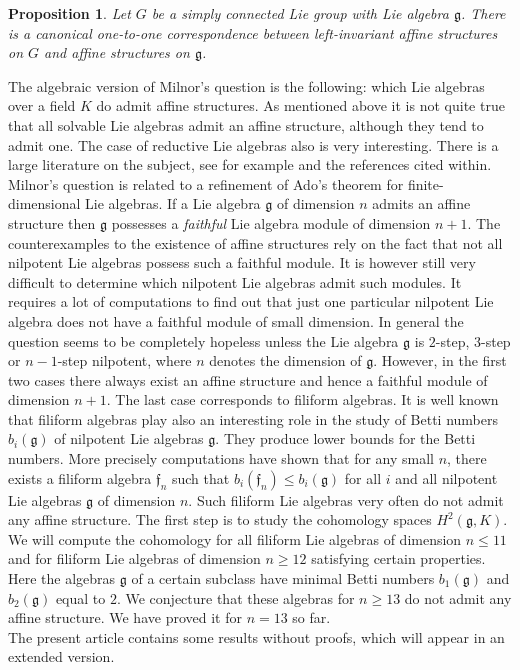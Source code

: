 \documentclass[12pt]{amsart}
\newtheorem{prop}[thm]{Proposition}
\theoremstyle{definition}
\theoremstyle{remark}
\newcommand{\Lf}{\mathfrak{f}}
\newcommand{\Lg}{\mathfrak{g}}
\begin{document}
\begin{prop}
Let $G$ be a simply connected Lie group with Lie algebra $\Lg$.
There is a canonical one-to-one correspondence between left-invariant 
affine structures on $G$ and affine structures on $\Lg$. 
\end{prop}

The algebraic version of Milnor's question is the following:
which Lie algebras over a field $K$ do admit affine structures. 
As mentioned above it is not quite true that all solvable
Lie algebras admit an affine structure, although they tend to
admit one. The case of reductive Lie algebras also is very interesting.
There is a large literature on the subject, see for example \cite{BU2} 
and the references cited within. 
Milnor's question is related to a refinement of Ado's theorem
for finite-dimensional Lie algebras. If a Lie algebra $\Lg$ of dimension
$n$ admits an affine structure then $\Lg$ possesses a {\it faithful}
Lie algebra module of dimension $n+1$. The counterexamples to the
existence of affine structures rely on the fact that not all nilpotent
Lie algebras possess such a faithful module.
It is however still very difficult to determine which nilpotent Lie
algebras admit such modules. It requires a lot of computations to
find out that just one particular nilpotent Lie algebra does not have
a faithful module of small dimension. In general the question seems
to be completely hopeless unless the Lie algebra $\Lg$ is $2$-step, $3$-step
or $n-1$-step nilpotent, where $n$ denotes the dimension of $\Lg$.
However, in the first two cases there always exist an affine structure and hence
a faithful module of dimension $n+1$. The last case corresponds to filiform 
algebras. It is well known \cite{AS} that filiform algebras play also an 
interesting role in the study of Betti numbers $b_i(\Lg)$ of nilpotent 
Lie algebras $\Lg$. They produce lower bounds for the Betti
numbers. More precisely computations have shown that for any small $n$, there exists 
a filiform algebra $\Lf_n$ such that $b_i(\Lf_n)\le b_i(\Lg)$ for all $i$ and all 
nilpotent Lie algebras $\Lg$ of dimension $n$. 
Such filiform Lie algebras very often do not admit any affine structure.
The first step is to study the cohomology spaces $H^2(\Lg,K)$. 
We will compute the cohomology for all filiform Lie algebras of dimension
$n\le 11$ and for filiform Lie algebras of dimension $n\ge 12$ satisfying
certain properties. Here the algebras $\Lg$ of a certain subclass 
have minimal Betti numbers $b_1(\Lg)$ and $b_2(\Lg)$ equal to $2$. 
We conjecture that these algebras for $n\ge 13$ do not admit any affine structure.
We have proved it for $n=13$ so far.\\
The present article contains some results without proofs, which will appear
in an extended version.
\end{document}
